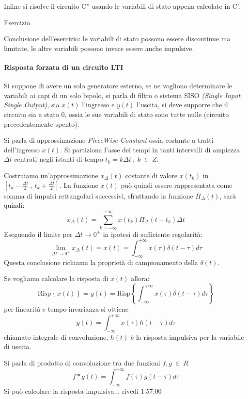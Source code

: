 Infine si risolve il circuito C'' usando le variabili di stato appena calcolate in C'.

Esercizio 

Conclusione dell'esercizio: le variabili di stato possono essere discontinue ma limitate, le altre
variabili possono invece essere anche impulsive.

\paragraph{Risposta forzata di un circuito LTI}
Si suppone di avere un solo generatore esterno, se ne vogliono determinare le variabili ai capi
di un solo bipolo, si parla di filtro o sistema SISO \textit{(Single Input Single Output)},
sia $x(t)$ l'ingresso e $y(t)$ l'uscita, si deve supporre che il circuito sia a stato 0, ossia
le sue variabili di stato sono tutte nulle (circuito precedentemente spento).

Si parla di approssimazione \textit{PieceWise-Constant} ossia costante a tratti dell'ingresso
$x(t)$.
Si partiziona l'asse dei tempi in tanti intervalli di ampiezza $\Delta t$ centrati negli istanti
di tempo $t_k = k\Delta t\ ,\ k\ \in\ Z$.

Costruiamo un'approssimazione $x_\Delta(t)$ costante di valore $x(t_k)$ in $\left[t_k-\frac{\Delta t}{2}\ ,\ 
t_k+\frac{\Delta t}{2}\right]$.
La funzione $x(t)$ può quindi essere rappresentata come somma di impulsi rettangolari successivi,
sfruttando la funzione $\Pi_{\Delta}(t)$, sarà quindi:
$$
x_{\Delta}(t) = \sum_{k = -\infty}^{+\infty} x(t_k) \Pi_\Delta(t-t_k)\Delta t
$$
Eseguendo il limite per $\Delta t \rightarrow 0^+$ in ipotesi di sufficiente regolarità:
$$
\lim_{\Delta t \to 0^+} x_\Delta(t) = x(t) = \int_{-\infty}^{+\infty} x(\tau) \delta (t-\tau)
d\tau
$$
Questa conclusione richiama la proprietà di campionamento della $\delta(t)$.

Se vogliamo calcolare la risposta di $x(t)$ allora:
$$
\text{Risp}\left\{x(t)\right\} = y(t) = \text{Risp} \left\{\int_{-\infty}^{+\infty} x(\tau)\delta(t-\tau)
d\tau\right\}
$$
per linearità e tempo-invarianza si ottiene
$$
y(t) = \int_{-\infty}^{+\infty} x(\tau)h(t-\tau) d\tau
$$
chiamato integrale di convoluzione, $h(t)$ è la risposta impulsiva per la variabile di uscita.

Si parla di prodotto di convoluzione tra due funzioni $f,g \ \in\ R$
$$
f * g(t) = \int_{-\infty}^{+\infty} f(\tau)g(t-\tau)d\tau
$$
Si può calcolare la risposta impulsiva... rivedi 1:57:00
